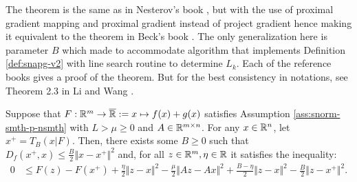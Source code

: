 \documentclass[12pt]{article}
\begin{document}
            \begin{remark}
                The theorem is the same as in Nesterov's book \cite[Theorem 2.2.13]{nesterov_lectures_2018}, but with the use of proximal gradient mapping and proximal gradient instead of project gradient hence making it equivalent to the theorem in Beck's book \cite[Theorem 10.16]{beck_first-order_2017}. 
                The only generalization here is parameter $B$ which made to accommodate algorithm that implements Definition \ref{def:snapg-v2} with line search routine to determine $L_k$. 
                Each of the reference books gives a proof of the theorem. 
                But for the best consistency in notations, see Theorem 2.3 in Li and Wang \cite{li_relaxed_2025}. 
            \end{remark}
            \begin{theorem}\label{thm:pg-ineq-sq-scnvx}
                Suppose that $F:\mathbb R^m \rightarrow \overline {\mathbb R} := x \mapsto f(x) + g(x)$ satisfies Assumption \ref{ass:snorm-smth-p-nsmth} with $L > \mu \ge 0$ and $A \in \mathbb R^{m\times n}$. 
                For any $x \in \mathbb R^n$, let $x^+ = T_B(x | F)$.
                Then, there exists some $B \ge 0$ such that $D_f(x^+, x) \le \frac{B}{2}\Vert x - x^+\Vert^2$ and, for all $z \in \mathbb R^m, \eta \in \mathbb R$ it satisfies the inequality: 
                \begin{align*}
                    0 &\le F(z) - F(x^+)
                    + \frac{\eta}{2}\Vert z - x\Vert^2 
                    - \frac{\mu}{2}\Vert Az - Ax\Vert^2
                    + \frac{B - \eta}{2}\Vert z - x\Vert^2
                    - \frac{B}{2}\Vert z - x^+\Vert^2 . 
                \end{align*}
            \end{theorem}
\end{document}
